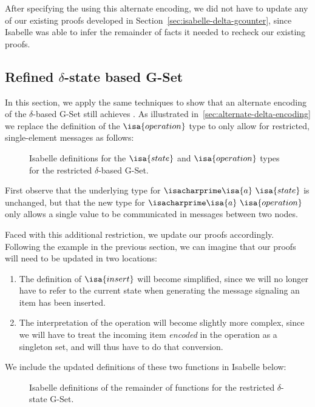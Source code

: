 After specifying the \CRDT using this alternate encoding, we did not have to
update any of our existing proofs developed in
Section~\ref{sec:isabelle-delta-gcounter}, since Isabelle was able to infer the
remainder of facts it needed to recheck our existing proofs.

\subsection{Refined $\delta$-state based G-Set}

In this section, we apply the same techniques to show that an alternate encoding
of the $\delta$-based G-Set still achieves \SEC. As illustrated
in~\ref{sec:alternate-delta-encoding} we replace the definition of the
$\isa{operation}$ type to only allow for restricted, single-element messages
as follows:

\begin{figure}[H]
  
  \caption{Isabelle definitions for the $\isa{state}$ and $\isa{operation}$
    types for the restricted $\delta$-based G-Set.}
\end{figure}

First observe that the underlying type for $\isacharprime\isa{a}~\isa{state}$ is
unchanged, but that the new type for $\isacharprime\isa{a}~\isa{operation}$ only
allows a single value to be communicated in messages between two nodes.

Faced with this additional restriction, we update our proofs accordingly.
Following the example in the previous section, we can imagine that our proofs
will need to be updated in two locations:
\begin{enumerate}
  \item The definition of $\isa{insert}$ will become simplified, since we will
    no longer have to refer to the current state when generating the message
    signaling an item has been inserted.
  \item The interpretation of the operation will become slightly more complex,
    since we will have to treat the incoming item \emph{encoded} in the operation
    as a singleton set, and will thus have to do that conversion.
\end{enumerate}

We include the updated definitions of these two functions in Isabelle below:

\begin{figure}[H]
  
  \caption{Isabelle definitions of the remainder of functions for the restricted
    $\delta$-state G-Set.}
\end{figure}

